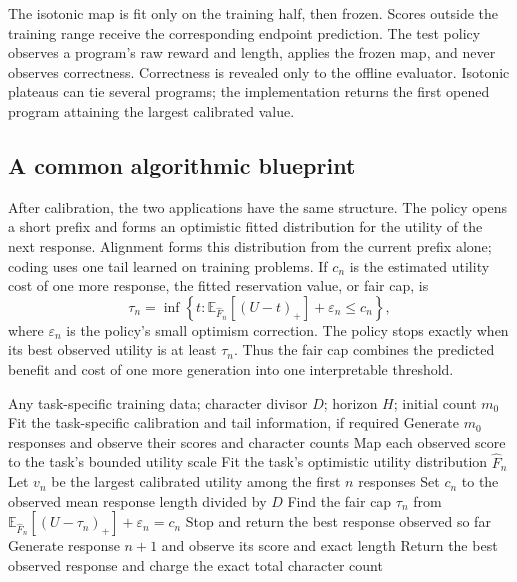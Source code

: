The isotonic map is fit only on the training half, then frozen.  Scores outside
the training range receive the corresponding endpoint prediction.  The test
policy observes a program's raw reward and length, applies the frozen map, and
never observes correctness.  Correctness is revealed only to the offline
evaluator.  Isotonic plateaus can tie several programs; the implementation
returns the first opened program attaining the largest calibrated value.

\subsection{A common algorithmic blueprint}
\label{sec:blueprint}

After calibration, the two applications have the same structure.  The policy
opens a short prefix and forms an optimistic fitted distribution for the
utility of the next response.  Alignment forms this distribution from the
current prefix alone; coding uses one tail learned on training problems.  If
$c_n$ is the estimated utility cost of one more response, the fitted
reservation value, or fair cap, is
\begin{equation}
 \tau_n=\inf\left\{t:
   \mathbb E_{\widehat F_n}[(U-t)_+] + \varepsilon_n\le c_n
 \right\},
 \label{eq:fitted-fair-cap}
\end{equation}
where $\varepsilon_n$ is the policy's small optimism correction.  The policy
stops exactly when its best observed utility is at least $\tau_n$.  Thus the
fair cap combines the predicted benefit and cost of one more generation into
one interpretable threshold.

\begin{algorithm}[t]
\caption{Blueprint for adaptive LLM generation}
\label{alg:llm-blueprint}
\begin{algorithmic}[1]
\Require Any task-specific training data; character divisor $D$; horizon $H$;
initial count $m_0$
\State Fit the task-specific calibration and tail information, if required
\State Generate $m_0$ responses and observe their scores and character counts
\State Map each observed score to the task's bounded utility scale
  \State Fit the task's optimistic utility distribution $\widehat F_n$
  \State Let $v_n$ be the largest calibrated utility among the first $n$
         responses
  \State Set $c_n$ to the observed mean response length divided by $D$
  \State Find the fair cap $\tau_n$ from
         $\mathbb E_{\widehat F_n}[(U-\tau_n)_+]+\varepsilon_n=c_n$
    \State Stop and return the best response observed so far
  \EndIf
  \State Generate response $n+1$ and observe its score and exact length
\EndFor
\State Return the best observed response and charge the exact total character
       count
\end{algorithmic}
\end{algorithm}

